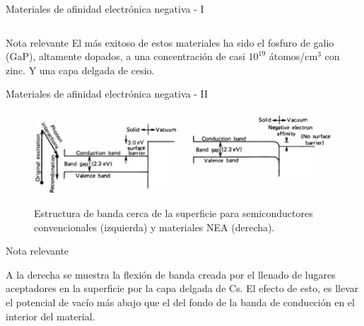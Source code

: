 \documentclass[a4paper,10pt]{beamer}
\begin{document}
\begin{frame}{Materiales de afinidad electrónica negativa - I}
\begin{columns}[c]
\end{columns}
 
  \begin{block}{Nota relevante}
  El más exitoso de estos materiales ha sido el fosfuro de galio (GaP), altamente 
  dopados, a una concentración de casi $10^19$ átomos/cm$^3$ con zinc. Y una capa
  delgada de cesio.
 \end{block}

\end{frame}

\begin{frame}{Materiales de afinidad electrónica negativa - II}

\begin{figure}
 \includegraphics[scale=0.33]{fig10}
 \caption{Estructura de banda cerca de la superficie para semiconductores 
 convencionales (izquierda) y materiales NEA (derecha).}
\end{figure}

\begin{block}{Nota relevante}
\begin{justify}
 A la derecha se muestra la flexión de banda creada por el llenado de lugares 
 aceptadores en la superficie por la capa delgada de Cs. El efecto de esto, 
 es llevar el potencial de vacío más abajo que el del fondo de la banda de 
 conducción en el interior del material.
 \end{justify}
\end{block}

\end{frame}
\end{document}
